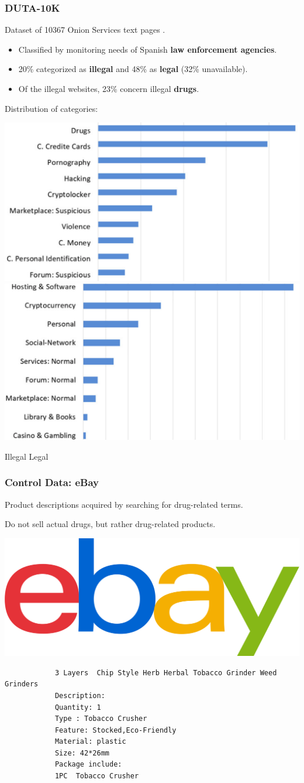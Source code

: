 \documentclass[t,xcolor={svgnames,table}]{beamer}
\begin{document}
\begin{frame}
	\frametitle{DUTA-10K}
	
	Dataset of 10367 Onion Services text pages \cite{AlNabki19}.

	\begin{itemize}\setlength\itemsep{1em}
		\item Classified by monitoring needs of Spanish \textbf{law enforcement agencies}.
		\item 20\% categorized as \textbf{illegal} and 48\% as \textbf{legal} (32\% unavailable).
		\item Of the illegal websites, 23\% concern illegal \textbf{drugs}.
	\end{itemize}
	\vfill
	\pause

	Distribution of categories:
	
	\includegraphics[width=.49\textwidth]{suspicious.png}\hfill\includegraphics[width=.49\textwidth]{normal.png}
	
	\hspace{2cm} Illegal \hspace{5cm} Legal
\end{frame}

\begin{frame}[fragile]
	\frametitle{Control Data: eBay}
	Product descriptions acquired by searching for drug-related terms.
	\vfill
	
	Do not sell actual drugs, but rather drug-related products.
	\vfill
	
	\begin{center}
	\includegraphics[width=.5\textwidth]{ebay.png}
	\end{center}
	\vfill
	
	\small
	\begin{center}\color{green}
		\begin{verbatim}
			3 Layers  Chip Style Herb Herbal Tobacco Grinder Weed Grinders
			Description:
			Quantity: 1
			Type : Tobacco Crusher
			Feature: Stocked,Eco-Friendly
			Material: plastic
			Size: 42*26mm
			Package include:
			1PC  Tobacco Crusher
		\end{verbatim}
	\end{center}
\end{frame}
\end{document}
